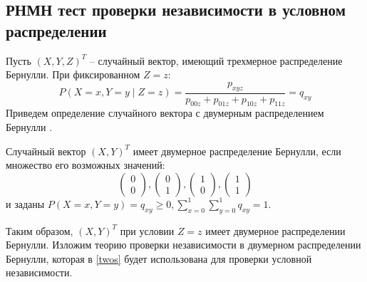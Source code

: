\begin{center}
    \subsection{РНМН тест проверки независимости в условном
распределении}\label{bivariate_umpu}
\end{center}
     

Пусть $(X,Y,Z)^T$ -- случайный вектор, имеющий трехмерное распределение Бернулли.
При фиксированном $Z=z$:
$$
P(X=x,Y=y \mid Z=z) =
\dfrac{p_{xyz}}{p_{00z}+p_{01z}+p_{10z}+p_{11z}} = q_{xy}
$$
Приведем определение случайного вектора с 
двумерным распределением Бернулли \cite{Dai2013}.
\begin{definition}
    Случайный вектор $(X,Y)^T$ имеет двумерное распределение Бернулли,
    если множество его возможных значений:
    $$
        \begin{pmatrix}
            0 \\
            0
        \end{pmatrix},
        \begin{pmatrix}
            0 \\
            1
        \end{pmatrix},
        \begin{pmatrix}
            1 \\
            0
        \end{pmatrix},
        \begin{pmatrix}
            1 \\
            1
        \end{pmatrix}
    $$ и заданы $P(X=x,Y=y)=q_{xy} \geq 0,  \sum_{x=0}^1 \sum_{y=0}^1 q_{xy} =1$.
\end{definition}
Таким образом, $(X,Y)^T$ при условии $Z=z$ имеет двумерное распределении Бернулли.
Изложим теорию проверки независимости в двумерном распределении Бернулли,
которая в \autoref{twos} будет использована для проверки условной независимости.

